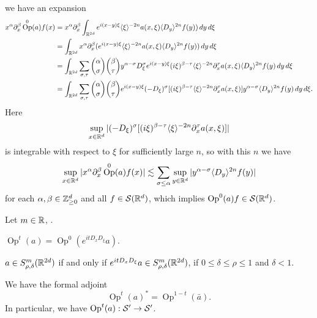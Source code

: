 \documentclass{../../large}
\DeclareMathOperator{\Op}{Op}
\begin{document}
\begin{pf}
we have an expansion
\begin{align*}
x^\alpha\partial_x^\beta\Op^0(a)f(x)
&=x^\alpha\partial_x^\beta\int_{\R^{2d}}e^{i(x-y)\xi}\<\xi\>^{-2n}a(x,\xi)\<D_y\>^{2n}f(y))\,dy\,d\xi\\
&=\int_{\R^{2d}}x^\alpha\partial_x^\beta(e^{i(x-y)\xi}\<\xi\>^{-2n}a(x,\xi)\<D_y\>^{2n}f(y))\,dy\,d\xi\\
&=\int_{\R^{2d}}\sum_{\sigma,\tau}{\alpha\choose\sigma}{\beta\choose\tau}y^{\alpha-\sigma}D_\xi^{\sigma}e^{i(x-y)\xi}(i\xi)^{\beta-\tau}\<\xi\>^{-2n}\partial_x^\tau a(x,\xi)\<D_y\>^{2n}f(y)\,dy\,d\xi\\
&=\int_{\R^{2d}}\sum_{\sigma,\tau}{\alpha\choose\sigma}{\beta\choose\tau}e^{i(x-y)\xi}(-D_\xi)^{\sigma}[(i\xi)^{\beta-\tau}\<\xi\>^{-2n}\partial_x^\tau a(x,\xi)]y^{\alpha-\sigma}\<D_y\>^{2n}f(y)\,dy\,d\xi.
\end{align*}
Here
\[\sup_{x\in\mathbb{R}^d}|(-D_\xi)^{\sigma}[(i\xi)^{\beta-\tau}\langle\xi\rangle^{-2n}\partial_x^\tau a(x,\xi)]|\]
is integrable with respect to $\xi$ for sufficiently large $n$, so with this $n$ we have
\[\sup_{x\in\R^d}|x^\alpha\partial_x^\beta\Op^0(a)f(x)|\lesssim\sum_{\sigma\le\alpha}\sup_{y\in\R^d}|y^{\alpha-\sigma}\<D_y\>^{2n}f(y)|\]
for each $\alpha,\beta\in\mathbb{Z}_{\ge0}^d$ and all $f\in\mathcal{S}(\mathbb{R}^d)$, which implies $\Op^0(a)f\in\cS(\R^d)$.
\end{pf}

\begin{prb}
Let $m\in\mathbb{R}$, .
\begin{parts}
\item $\Op^t(a)=\Op^0(e^{itD_xD_\xi}a)$.
\item $a\in S_{\rho,\delta}^m(\mathbb{R}^{2d})$ if and only if $e^{itD_xD_\xi}a\in S_{\rho,\delta}^m(\mathbb{R}^{2d})$, if $0\le\delta\le\rho\le1$ and $\delta<1$.
\item We have the formal adjoint
\[\Op^t(a)^*=\Op^{1-t}(\bar a).\]
In particular, we have $\Op^t(a):\cS'\to\cS'$.
\end{parts}
\end{prb}
\end{document}
